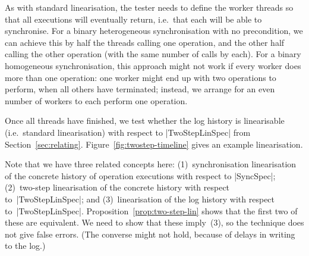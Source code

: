 
As with standard linearisation, the tester needs to define the worker threads
so that all executions will eventually return, i.e.~that each will be able to
synchronise.  For a binary heterogeneous synchronisation with no precondition,
we can achieve this by half the threads calling one operation, and the other
half calling the other operation (with the same number of calls by each).  For
a binary homogeneous synchronisation, this approach might not work if every
worker does more than one operation: one worker might end up with two
operations to perform, when all others have terminated; instead, we arrange
for an even number of workers to each perform one operation. 

Once all threads have finished, we test whether the log history is
linearisable (i.e.~standard linearisation) with respect to |TwoStepLinSpec|
from Section~\ref{sec:relating}.  Figure~\ref{fig:twostep-timeline} gives an
example linearisation. 

Note that we have three related concepts here: (1)~synchronisation
linearisation of the concrete history of operation executions with respect to
|SyncSpec|; (2)~two-step linearisation of the concrete history with respect
to~|TwoStepLinSpec|; and (3)~linearisation of the log history with respect
to~|TwoStepLinSpec|.  Proposition~\ref{prop:two-step-lin} shows that the first
two of these are equivalent.  We need to show that these imply~(3), so the
technique does not give false errors.  (The converse might not hold, because
of delays in writing to the log.)

